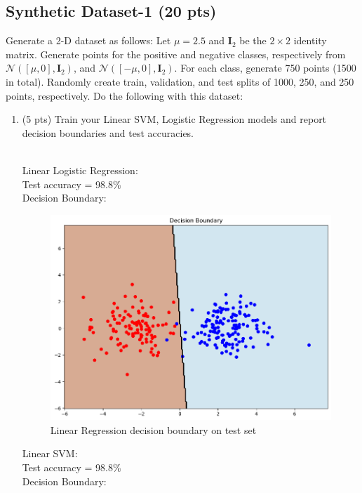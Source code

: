\documentclass[a4paper]{article}
\theoremstyle{definition}
\newenvironment{soln}{
    \leavevmode\color{blue}\ignorespaces
}{}
\begin{document}
\subsection{ Synthetic Dataset-1 (20 pts)}
Generate a 2-D dataset as follows:
Let $\mu = 2.5$ and $\mathbf I_2$ be the $2 \times 2$ identity matrix. Generate points for the positive and negative classes, respectively
from $\mathcal{N} ([\mu, 0], \mathbf I_2)$, and $\mathcal{N} ([-\mu, 0], \mathbf I_2)$. For each class, generate 750 points (1500 in total). Randomly create train, validation, and test splits of 1000, 250, and 250 points, respectively. Do the following with this dataset:
\begin{enumerate}
    \item  (5 pts) Train your Linear SVM, Logistic Regression models and report decision boundaries and test accuracies.
    \begin{soln}
        \\ {\fontsize{10pt}{12pt}\selectfont Linear Logistic Regression:} 
        \\ Test accuracy = 98.8\%
        \\ Decision Boundary:
        \begin{figure}[H]
            \includegraphics[width=\textwidth]{images/gaussian-linear-lr.png}
            \caption{ Linear Regression decision boundary on test set}
        \end{figure}
        {\fontsize{10pt}{12pt}\selectfont Linear SVM:} 
        \\ Test accuracy = 98.8\%
        \\ Decision Boundary:
        \begin{figure}[H]

\end{figure}
\end{soln}
\end{enumerate}
\end{document}
